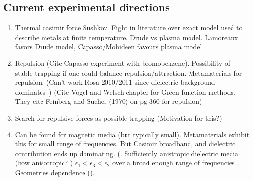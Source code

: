 \subsection{Current experimental directions}
\begin{enumerate}
\item Thermal casimir force
Sushkov\cite{Sushkov2011}.
Fight in literature over exact model used to describe metals at finite temperature.
Drude vs plasma model.  
 Lamoreaux favors Drude model, Capasso/Mohideen favours plasma model.
\item Repulsion (Cite Capasso experiment with bromobenzene).  Possibility of stable trapping
  if one could balance repulsion/attraction.  
 Metamaterials for repulsion.  (Can't work Rosa 2010/2011 since dielectric
  background dominates~\cite{Rosa2008})
  (Cite Vogel and Welsch chapter for Green function methods.  They cite 
  Feinberg and Sucher (1970) on pg 360 for repulsion)
  \item Search for repulsive forces as possible trapping (Motivation for this?)
  \item Can be found for magnetic media (but typically small).
    Metamaterials exhibit this for small range of frequencies.
    But Casimir broadband, and dielectric contribution ends up dominating.
    (.
    Sufficiently anistropic dielectric media (how anisotropic? )
    $\epsilon_1<\epsilon_3<\epsilon_2$ over a broad enough range of frequencies 
    .
    Geometries dependence ().
    


\end{enumerate}

